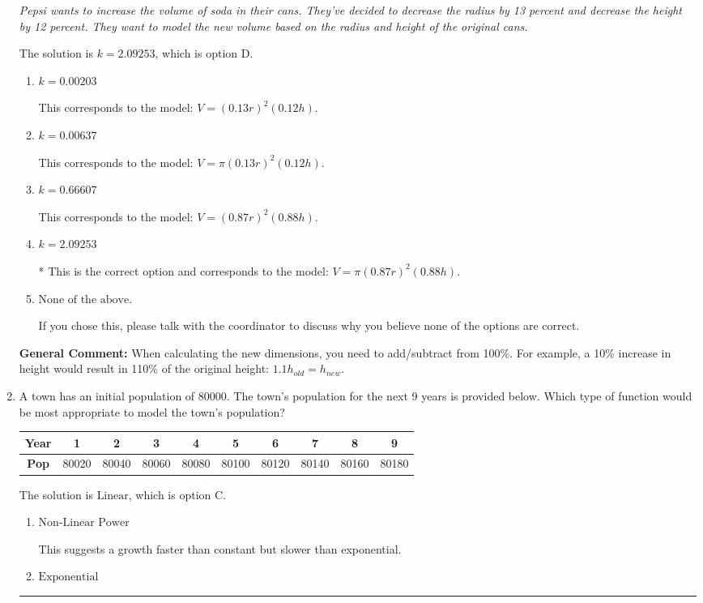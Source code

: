 \documentclass{extbook}[14pt]
\newcommand{\litem}[1]{\item #1

\rule{\textwidth}{0.4pt}}
\begin{document}
\begin{enumerate}
{\begin{center}
    \textit{ Pepsi wants to increase the volume of soda in their cans. They've decided to decrease the radius by 13 percent and decrease the height by 12 percent. They want to model the new volume based on the radius and height of the original cans. }
\end{center}
The solution is \( k = 2.09253 \), which is option D.\begin{enumerate}[label=\Alph*.]
\item \( k = 0.00203 \)

This corresponds to the model: $V = (0.13 r)^2 (0.12 h)$.
\item \( k = 0.00637 \)

This corresponds to the model: $V = \pi (0.13 r)^2 (0.12 h)$.
\item \( k = 0.66607 \)

This corresponds to the model: $V = (0.87 r)^2 (0.88 h)$.
\item \( k = 2.09253 \)

* This is the correct option and corresponds to the model: $V = \pi (0.87 r)^2 (0.88 h)$.
\item \( \text{None of the above.} \)

If you chose this, please talk with the coordinator to discuss why you believe none of the options are correct.
\end{enumerate}

\textbf{General Comment:} When calculating the new dimensions, you need to add/subtract from 100\%. For example, a 10\% increase in height would result in 110\% of the original height: $1.1h_{old} = h_{new}$.
}
\litem{
A town has an initial population of 80000. The town's population for the next 9 years is provided below. Which type of function would be most appropriate to model the town's population?


\begin{tabular}{c|c|c|c|c|c|c|c|c|c}
\textbf{Year} &1 &2 &3 &4 &5 &6 &7 &8 &9\tabularnewline \hline
\textbf{Pop} &80020 &80040 &80060 &80080 &80100 &80120 &80140 &80160 &80180\end{tabular}The solution is \( \text{Linear} \), which is option C.\begin{enumerate}[label=\Alph*.]
\item \( \text{Non-Linear Power} \)

This suggests a growth faster than constant but slower than exponential.
\item \( \text{Exponential} \)


\end{enumerate}}
\end{enumerate}
\end{document}
